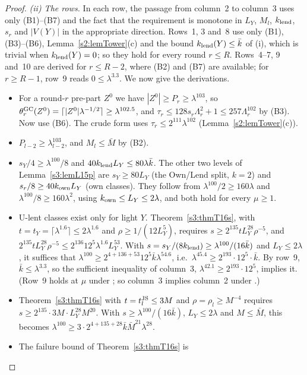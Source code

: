 \begin{proof}
\emph{(ii) The rows.} In each row, the passage from column~2 to column~3
uses only (B1)--(B7) and the fact that the requirement is monotone in
$L_Y$, $M_l$, $k_{\mathrm{lend}}$, $s_r$ and $|V(Y)|$ in the appropriate direction.
Rows~1, 3 and~8 use only (B1), (B3)--(B6), Lemma~\ref{s2:lemTower}(c)
and the bound $k_{\mathrm{lend}}(Y)\le\bar k$ of (i), which is trivial when
$k_{\mathrm{lend}}(Y)=0$; so they hold for every round $r\le R$. Rows~4--7, 9 and~10
are derived for $r\le R-2$, where (B2) and (B7) are available; for
$r\ge R-1$, row~9 reads $0\le\lambda^{3.3}$.
We now give the derivations.
\begin{itemize}
\item[1.] For a round-$r$ pre-part $Z^0$ we have $|Z^0|\ge P_r\ge\lambda^{103}$, so
  $\theta^{\mathrm{GC}}_r(Z^0)=\lceil|Z^0|\lambda^{-1/2}\rceil\ge\lambda^{102.5}$,
  and $\tau_r\le128s_r\Lambda_r^2+1\le257\Lambda_r^{102}$ by (B3). Now
  use (B6). The crude form uses $\tau_r\le2^{111}\lambda^{102}$
  (Lemma~\ref{s2:lemTower}(c)).
\item[2.] $P_{l-2}\ge\lambda_{l-2}^{103}$, and $M_l\le\bar M$ by (B2).
\item[3.] $s_Y/4\ge\lambda^{100}/8$ and $40k_{\mathrm{lend}} L_Y\le80\lambda\bar k$.
  The other two levels of Lemma~\ref{s3:lemL15p} are $s_Y\ge80L_Y$ (the
  Own/Lend split, $k=2$) and $s_r/8\ge40k_{\mathrm{own}} L_Y$ (own classes). They
  follow from $\lambda^{100}/2\ge160\lambda$ and
  $\lambda^{100}/8\ge160\lambda^2$, using $k_{\mathrm{own}}\le L_Y\le2\lambda$, and
  both hold for every $\mu\ge1$.
\item[4.] U-lent classes exist only for light $Y$. Theorem~\ref{s3:thmT16s},
  with $t=t_Y=\lceil\lambda^{1.6}\rceil\le2\lambda^{1.6}$ and
  $\rho\ge1/(12L_Y^5)$, requires $s\ge2^{135}tL_Y^{28}\rho^{-5}$, and
  $2^{135}tL_Y^{28}\rho^{-5}\le2^{136}12^5\lambda^{1.6}L_Y^{53}$.
  With $s=s_Y/(8k_{\mathrm{lend}})\ge\lambda^{100}/(16\bar k)$ and $L_Y\le2\lambda$,
  it suffices that
  $\lambda^{100}\ge2^{4+136+53}12^5\bar k\lambda^{54.6}$, i.e.\
  $\lambda^{45.4}\ge2^{193}\cdot12^5\cdot\bar k$. By row~9,
  $\bar k\le\lambda^{3.3}$, so the sufficient inequality of column~3,
  $\lambda^{42.1}\ge2^{193}\cdot12^5$, implies it. (Row~9 holds at
  $\mu$ under ; so column~3 implies column~2 under \Gc{1}.)
\item[5.] Theorem~\ref{s3:thmT16s} with $t=t^{\mathrm{JS}}_l\le3M$ and
  $\rho=\rho_l\ge M^{-4}$ requires $s\ge2^{135}\cdot3M\cdot L_Y^{28}M^{20}$.
  With $s\ge\lambda^{100}/(16\bar k)$, $L_Y\le2\lambda$ and $M\le\bar M$,
  this becomes $\lambda^{100}\ge3\cdot2^{4+135+28}\bar k\bar M^{21}\lambda^{28}$.
\item[6.] The failure bound of Theorem~\ref{s3:thmT16s} is

\end{itemize}
\end{proof}
